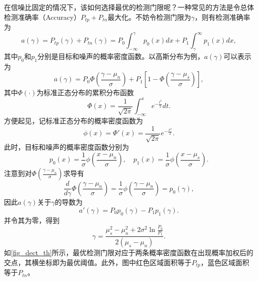 在信噪比固定的情况下，该如何选择最优的检测门限呢？一种常见的方法是令总体检测准确率（Accuracy）\( P_{tp} + P_{tn} \)最大化。不妨令检测门限为\( \gamma \)，则有检测准确率为
\[
    a(\gamma) = P_{tp}(\gamma) + P_{tn}(\gamma) =  P_{0} \int_{-\infty}^{\gamma} p_{0}(x) dx + P_{1} \int_{\gamma}^{\infty} p_{1}(x) dx,
\]
其中\( p_0 \)和\( p_1 \)分别是目标和噪声的概率密度函数。以高斯分布为例，\( a(\gamma) \)可以表示为
\[
    a(\gamma) = P_{0} \Phi\left( \frac{\gamma - \mu_n}{\sigma} \right) + P_{1} \left[ 1 - \Phi\left( \frac{\gamma - \mu_s}{\sigma} \right) \right],
\]
其中\( \Phi(\cdot) \)为标准正态分布的累积分布函数
\[
    \Phi(x) = \frac{1}{\sqrt{2\pi}} \int_{-\infty}^{x} e^{-\frac{t^2}{2}} dt.
\]
方便起见，记标准正态分布的概率密度函数为
\[
    \phi(x) = \Phi'(x) = \frac{1}{\sqrt{2\pi}} e^{-\frac{x^2}{2}}.
\]
此时，目标和噪声的概率密度函数分别为
\[
    p_0(x) = \frac{1}{\sigma}\phi\left( \frac{x - \mu_n}{\sigma} \right), \quad p_1(x) = \frac{1}{\sigma}\phi\left( \frac{x - \mu_s}{\sigma} \right).
\]
注意到对\( \Phi\left( \frac{\gamma - \mu_n}{\sigma} \right) \)求导有
\[
    \frac{d}{d\gamma} \Phi\left( \frac{\gamma - \mu_n}{\sigma} \right) = \frac{1}{\sigma}\phi\left( \frac{\gamma - \mu_n}{\sigma} \right) = p_0(\gamma),
\]
因此\( a(\gamma) \)关于\( \gamma \)的导数为
\[
    a'(\gamma) = P_{0} p_{0}(\gamma) - P_{1} p_{1}(\gamma).
\]
并令其为零，得到
\[
    \gamma = \frac{\mu_s^2 - \mu_n^2 + 2\sigma^2 \ln\frac{P_0}{P_1}}{2(\mu_s - \mu_n)}.
\]
如\cref{fig_dect_th}所示，最优检测门限对应于两条概率密度函数在出现概率加权后的交点，其横坐标即为最优阈值。此外，图中红色区域面积等于\( P_{tp} \)，蓝色区域面积等于\( P_{tn} \)。

